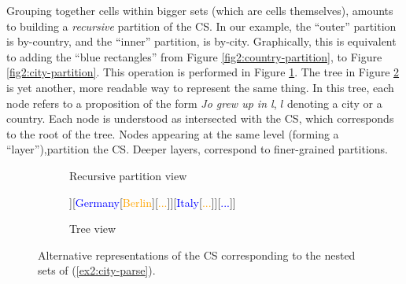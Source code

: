 Grouping together cells within bigger sets (which are cells themselves), amounts to building a \textit{recursive} partition of the CS. In our example, the ``outer'' partition is by-country, and the ``inner'' partition, is by-city. Graphically, this is equivalent to adding the ``blue rectangles'' from Figure \ref{fig2:country-partition}, to Figure \ref{fig2:city-partition}. This operation is performed in Figure \ref{fig2:city-recursive-partition}. The tree in Figure \ref{fig2:city-tree} is yet another, more readable way to represent the same thing. In this tree, each node refers to a proposition of the form \textit{Jo grew up in l}, $l$ denoting a city or a country. Each node is understood as intersected with the CS, which corresponds to the root of the tree. Nodes appearing at the same level (forming a ``layer''),partition the CS. Deeper layers, correspond to finer-grained partitions.

\begin{figure}[H]
	\centering
	\begin{subfigure}[t]{.45\linewidth}
		\centering
		\caption{Recursive partition view}\label{fig2:city-recursive-partition}
	\end{subfigure}
	\hfill
	\begin{subfigure}[t]{.5\linewidth}
		\centering
		\vspace{-4.4cm}
		\begin{forest}
			[{CS\\
				Jo grew up in...}[\textcolor{blue}{France}[\textcolor{orange}{{Paris}}][\textcolor{orange}{Lyon}][\textcolor{orange}{...}]][\textcolor{blue}{Germany}[\textcolor{orange}{Berlin}][\textcolor{orange}{...}]][\textcolor{blue}{Italy}[\textcolor{orange}{...}]][\textcolor{blue}{...}]]
		\end{forest}
		\caption{Tree view}\label{fig2:city-tree}
	\end{subfigure}
	\caption{Alternative representations of the CS corresponding to the nested sets of (\ref{ex2:city-parse}).}\label{tree:country-city-parse}
\end{figure}

